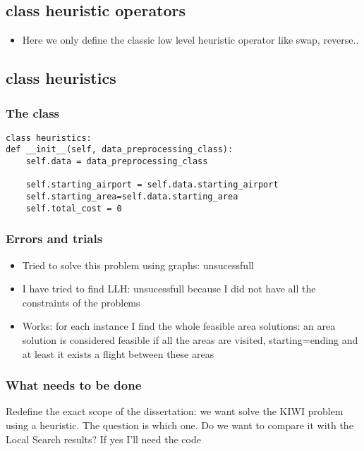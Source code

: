 \subsection{class heuristic operators}
\begin{itemize}
    \item Here we only define the classic low level heuristic operator like swap, reverse..
\end{itemize}

\subsection{class heuristics}

\subsubsection{The class}
\begin{lstlisting}
class heuristics:
def __init__(self, data_preprocessing_class):
    self.data = data_preprocessing_class
    
    self.starting_airport = self.data.starting_airport
    self.starting_area=self.data.starting_area
    self.total_cost = 0    
\end{lstlisting}


\subsubsection{Errors and trials}
\begin{itemize}
    \item Tried to solve this problem using graphs: unsucessfull
    \item I have tried to find LLH: unsucessfull because I did not have all the constraints of the problems
    \item Works: for each instance I find the whole feasible area solutions: an area solution is considered feasible if all the areas are visited, starting=ending and at least it exists a flight between these areas
\end{itemize}

\subsubsection{What needs to be done}
Redefine the exact scope of the dissertation: we want solve the KIWI problem using a heuristic.
The question is which one. 
Do we want to compare it with the Local Search results? If yes I'll need the code

